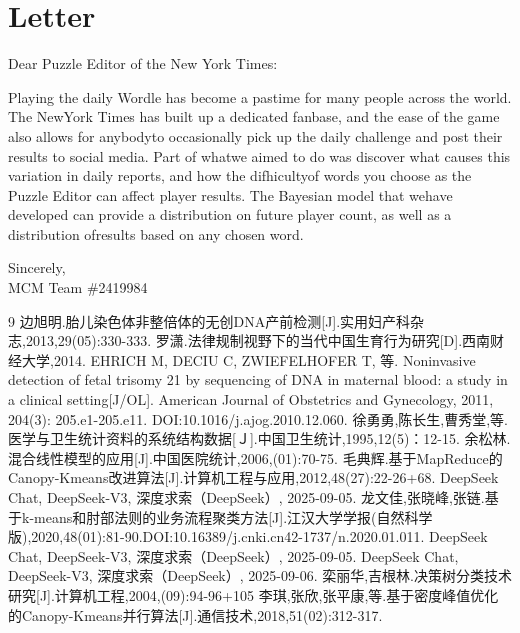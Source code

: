 \documentclass{mcmthesis}  %
\begin{document}
	\section*{\centering Letter}
	\noindent Dear Puzzle Editor of the New York Times:
	
	Playing the daily Wordle has become a pastime for many people across the world. The NewYork Times has built up a dedicated fanbase, and the ease of the game also allows for anybodyto occasionally pick up the daily challenge and post their results to social media. Part of whatwe aimed to do was discover what causes this variation in daily reports, and how the difhicultyof words you choose as the Puzzle Editor can affect player results. The Bayesian model that wehave developed can provide a distribution on future player count, as well as a distribution ofresults based on any chosen word.
	\begin{flushright}
		Sincerely,\\
		MCM Team \#2419984
	\end{flushright}
	
	
	\newpage
	\begin{thebibliography}{9}%
		 边旭明.胎儿染色体非整倍体的无创DNA产前检测[J].实用妇产科杂志,2013,29(05):330-333.
		 罗潇.法律规制视野下的当代中国生育行为研究[D].西南财经大学,2014.
		 EHRICH M, DECIU C, ZWIEFELHOFER T, 等. Noninvasive detection of fetal trisomy 21 by sequencing of DNA in maternal blood: a study in a clinical setting[J/OL]. American Journal of Obstetrics and Gynecology, 2011, 204(3): 205.e1-205.e11. DOI:10.1016/j.ajog.2010.12.060.
		 徐勇勇,陈长生,曹秀堂,等.医学与卫生统计资料的系统结构数据[Ｊ].中国卫生统计,1995,12(5)：12-15.
		余松林.混合线性模型的应用[J].中国医院统计,2006,(01):70-75.
		毛典辉.基于MapReduce的Canopy-Kmeans改进算法[J].计算机工程与应用,2012,48(27):22-26+68.
		DeepSeek Chat, DeepSeek-V3, 深度求索（DeepSeek）, 2025-09-05.
		龙文佳,张晓峰,张链.基于k-means和肘部法则的业务流程聚类方法[J].江汉大学学报(自然科学版),2020,48(01):81-90.DOI:10.16389/j.cnki.cn42-1737/n.2020.01.011.
		DeepSeek Chat, DeepSeek-V3, 深度求索（DeepSeek）, 2025-09-05.
		DeepSeek Chat, DeepSeek-V3, 深度求索（DeepSeek）, 2025-09-06.
		栾丽华,吉根林.决策树分类技术研究[J].计算机工程,2004,(09):94-96+105
		李琪,张欣,张平康,等.基于密度峰值优化的Canopy-Kmeans并行算法[J].通信技术,2018,51(02):312-317.
	\end{thebibliography}
	
\end{document}
